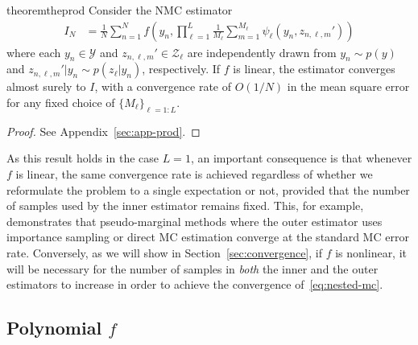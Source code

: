 \begin{restatable}{theorem}{theprod}
	\label{the:prod}
	Consider the NMC estimator
	\begin{align*}
	I_{N} &= \frac{1}{N}\sum_{n=1}^N f\left(y_n,\prod_{\ell=1}^{L} \frac{1}{M_{\ell}} \sum_{m=1}^{M_{\ell}} \psi_{\ell}(y_n,z_{n,\ell,m}')\right)
	\end{align*}
	where each $y_n \in \mathcal{Y}$ and $z_{n,\ell,m}' \in \mathcal{Z}_{\ell}$ are independently drawn from 
	$y_n \sim p(y)$ and $z_{n,\ell,m}' | y_n \sim p(z_{\ell} | y_n)$, respectively. If $f$ is linear, 
        the estimator converges almost surely to $I$,
	with a convergence rate of $O(1/N)$ in the mean square error for any fixed choice of $\{M_{\ell}\}_{\ell = 1:L}$.
\end{restatable}
\begin{proof}
See Appendix~\ref{sec:app-prod}.
\end{proof}

As this result holds in the case $L=1$, an important consequence is that
whenever $f$ is linear, the same convergence rate is achieved regardless of whether we
reformulate the problem to a single expectation or not, provided that the number of samples
used by the inner estimator remains fixed.  This, for example, demonstrates that pseudo-marginal
methods where the outer estimator uses importance sampling or direct MC estimation converge at the 
standard MC error rate.
Conversely, as we will show in Section~\ref{sec:convergence},
if $f$ is nonlinear, it will be necessary for the number of samples in \emph{both} the inner and the 
outer estimators to increase in order to achieve the convergence of~\eqref{eq:nested-mc}. 

\subsection{Polynomial $f$}
\label{sec:polynomial}

